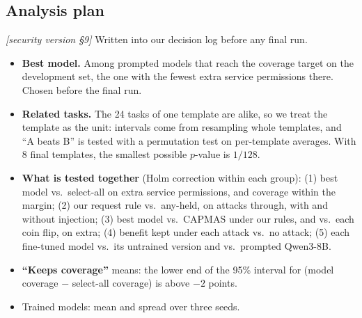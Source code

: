 \documentclass[10pt]{article}
\newcommand{\M}[1]{\textit{[security version #1]}}
\begin{document}
\subsection{Analysis plan}\label{sec:stats}
\M{\S9}
Written into our decision log before any final run.
\begin{itemize}
  \item \textbf{Best model.} Among prompted models that reach the coverage target on the development set, the one with the
    fewest extra service permissions there. Chosen before the final run.
  \item \textbf{Related tasks.} The 24 tasks of one template are alike, so we treat the template as the unit: intervals come
    from resampling whole templates, and ``A beats B'' is tested with a permutation test on per-template averages. With 8
    final templates, the smallest possible $p$-value is $1/128$.
  \item \textbf{What is tested together} (Holm correction within each group):
    (1) best model vs.\ select-all on extra service permissions, and coverage within the margin;
    (2) our request rule vs.\ any-held, on attacks through, with and without injection;
    (3) best model vs.\ CAPMAS under our rules, and vs.\ each coin flip, on extra;
    (4) benefit kept under each attack vs.\ no attack;
    (5) each fine-tuned model vs.\ its untrained version and vs.\ prompted Qwen3-8B.
  \item \textbf{``Keeps coverage''} means: the lower end of the 95\% interval for (model coverage $-$ select-all coverage) is
    above $-2$ points.
  \item Trained models: mean and spread over three seeds.
\end{itemize}
\end{document}
